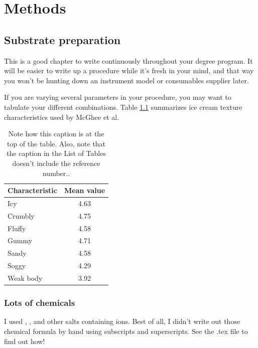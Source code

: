 \chapter{Methods}\label{ch:expt}


\section{Substrate preparation}

This is a good chapter to write continuously throughout your degree program.  It will be easier to write up a procedure while it's fresh in your mind, and that way you won't be hunting down an instrument model or consumables supplier later.

If you are varying several parameters in your procedure, you may want to tabulate your different combinations.  Table \ref{icecream} summarizes ice cream texture characteristics used by McGhee et al\cite{McGhee}.

\begin{table}[!htbp]
\caption[Note how this caption is at the top of the table.  Also, note that the caption in the List of Tables doesn't include the reference number.]{Note how this caption is at the top of the table.  Also, note that the caption in the List of Tables doesn't include the reference number.\cite{McGhee}. \label{icecream}}

\centering
\begin{tabular}{lc}
 Characteristic& Mean value\\\hline
Icy	 &4.63\\
Crumbly	 &4.75\\
Fluffy	 &4.58\\
Gummy	 &4.71\\
Sandy	 &4.58\\
Soggy	 &4.29\\
Weak body&3.92\\
\end{tabular}
\end{table}

\subsection{Lots of chemicals}

I used , , and other salts containing  ions.  Best of all, I didn't write out those chemical formula by hand using subscripts and superscripts.  See the .tex file to find out how!

